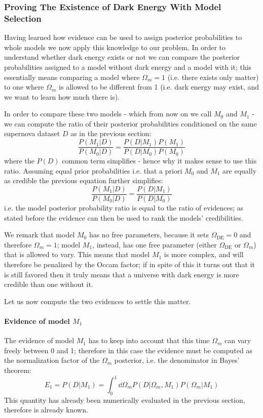 \subsubsection{Proving The Existence of Dark Energy With Model Selection}
Having learned how evidence can be used to assign posterior probabilities to whole models we now apply this knowledge to our problem.
In order to understand whether dark energy exists or not we can compare the posterior probabilities assigned to a model without dark energy and a model with it; this essentially means comparing a model where $\Omega_m=1$ (i.e. there exists only matter) to one where $\Omega_m$ is allowed to be different from 1 (i.e. dark energy may exist, and we want to learn how much there is).

In order to compare these two models - which from now on we call $M_0$ and $M_1$ - we can compute the ratio of their posterior probabilities conditioned on the same supernova dataset $D$ as in the previous section:
\begin{equation*}
    \frac{P(M_1|D)}{P(M_0|D)} = \frac{P(D|M_1)P(M_1)}{P(D|M_0)P(M_0)}
\end{equation*}
where the $P(D)$ common term simplifies - hence why it makes sense to use this ratio. Assuming equal prior probabilities i.e. that a priori $M_0$ and $M_1$ are equally as credible the previous equation further simplifies:
\begin{equation*}
    \frac{P(M_1|D)}{P(M_0|D)} = \frac{P(D|M_1)}{P(D|M_0)}
\end{equation*}
i.e. the model posterior probability ratio is equal to the ratio of evidences; as stated before the evidence can then be used to rank the models' credibilities.

We remark that model $M_0$ has no free parameters, because it sets $\Omega_{\text{DE}} = 0$ and therefore $\Omega_m = 1$; model $M_1$, instead, has one free parameter (either $\Omega_{\text{DE}}$ or $\Omega_m$) that is allowed to vary. This means that model $M_1$ is more complex, and will therefore be penalized by the Occam factor; if in spite of this it turns out that it is still favored then it truly means that a universe with dark energy is more credible than one without it.

Let us now compute the two evidences to settle this matter.
\paragraph{Evidence of model $M_1$}
The evidence of model $M_1$ has to keep into account that this time $\Omega_m$ can vary freely between 0 and 1; therefore in this case the evidence must be computed as the normalization factor of the $\Omega_m$ posterior, i.e. the denominator in Bayes' theorem:
\begin{equation*}
    E_1 = P(D|M_1) = \int_0^1 \dd{\Omega_m} P(D|\Omega_m, M_1) P(\Omega_m|M_1)
\end{equation*}
This quantity has already been numerically evaluated in the previous section, therefore is already known.


